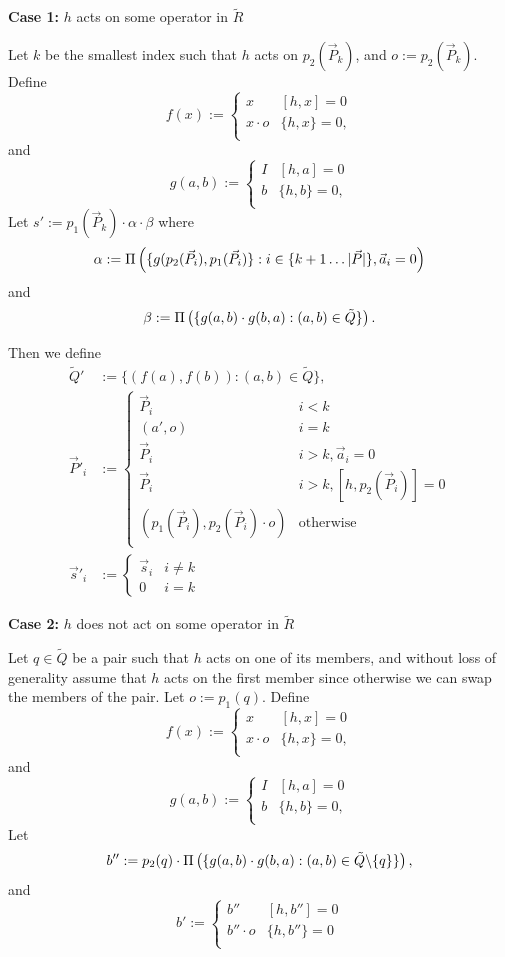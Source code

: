 \documentclass[twocolumn,showpacs,preprintnumbers,amsmath,amssymb,nofootinbib,pra,floatfix]{revtex4-1}
\newenvironment{definition}[1][Definition]{\begin{trivlist}
\item[\hskip \labelsep {\bfseries #1}]}{\end{trivlist}}
\newcommand{\lst}{\vec}
\newcommand{\set}{\tilde}
\begin{document}
\begin{definition}
\begin{center}
\textbf{Case 1:} $h$ acts on some operator in $\set R$
\end{center}

Let $k$ be the smallest index such that $h$ acts on $p_2(\lst P_k)$, and $o:=p_2(\lst P_k)$.  Define
$$
f(x) :=
\begin{cases}
x & [h,x] = 0 \\
x\cdot o & \{h,x\} = 0, \\
\end{cases}
$$
and
$$
g(a,b) :=
\begin{cases}
I & [h,a] = 0 \\
b & \{h,b\} = 0, \\
\end{cases}
$$
Let $s':=p_1(\lst P_k)\cdot \alpha \cdot \beta$ where
$$\alpha := \Pi\paren{\{g(p_2(\lst P_i),p_1(\lst P_i)\}:i\in\{k+1\dots |\lst P|\},\lst a_i=0}$$
and
$$\beta := \Pi\paren{\{g(a,b)\cdot g(b,a):(a,b)\in\set Q\}}.$$

Then we define
$$
\begin{aligned}
\set Q'&:= \{(f(a),f(b)):(a,b)\in\set Q\},\\
\lst P'_i&:=
\begin{cases}
\lst P_i & i < k \\
(a',o) & i = k \\
\lst P_i & i > k, \lst a_i=0 \\
\lst P_i & i > k, [h,p_2(\lst P_i)]=0 \\
(p_1(\lst P_i),p_2(\lst P_i)\cdot o) & \text{otherwise} \\
\end{cases}\\
\lst s'_i&:=
\begin{cases}
\lst s_i & i\ne k\\
0 & i =k
\end{cases}
\end{aligned}
$$

\begin{center}
\textbf{Case 2:} $h$ does not act on some operator in $\set R$
\end{center}

Let $q\in\set Q$ be a pair such that $h$ acts on one of its members, and without loss of generality assume that $h$ acts on the first member since otherwise we can swap the members of the pair.  Let $o:=p_1(q)$.
Define
$$
f(x) :=
\begin{cases}
x & [h,x] = 0 \\
x\cdot o & \{h,x\} = 0, \\
\end{cases}
$$
and
$$
g(a,b) :=
\begin{cases}
I & [h,a] = 0 \\
b & \{h,b\} = 0, \\
\end{cases}
$$
Let $$b'':=p_2(q)\cdot\Pi\paren{\{g(a,b)\cdot g(b,a):(a,b)\in\set Q\backslash\{q\}\}},$$ and
$$b':=
\begin{cases}
b'' & [h,b'']=0 \\
b''\cdot o & \{h,b''\}=0 \\
\end{cases}
$$


\end{definition}
\end{document}
